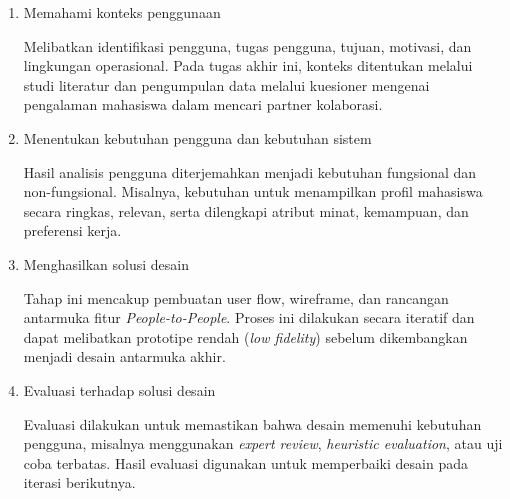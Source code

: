 \begin{enumerate}
\item {Memahami konteks penggunaan}

Melibatkan identifikasi pengguna, tugas pengguna, tujuan, motivasi, dan lingkungan operasional. Pada tugas akhir ini, konteks ditentukan melalui studi literatur dan pengumpulan data melalui kuesioner mengenai pengalaman mahasiswa dalam mencari partner kolaborasi.

\item {Menentukan kebutuhan pengguna dan kebutuhan sistem}

Hasil analisis pengguna diterjemahkan menjadi kebutuhan fungsional dan non-fungsional. Misalnya, kebutuhan untuk menampilkan profil mahasiswa secara ringkas, relevan, serta dilengkapi atribut minat, kemampuan, dan preferensi kerja.

\item {Menghasilkan solusi desain}

Tahap ini mencakup pembuatan user flow, wireframe, dan rancangan antarmuka fitur \textit{People-to-People}. Proses ini dilakukan secara iteratif dan dapat melibatkan prototipe rendah (\textit{low fidelity}) sebelum dikembangkan menjadi desain antarmuka akhir.

\item {Evaluasi terhadap solusi desain}

Evaluasi dilakukan untuk memastikan bahwa desain memenuhi kebutuhan pengguna, misalnya menggunakan \textit{expert review}, \textit{heuristic evaluation}, atau uji coba terbatas. Hasil evaluasi digunakan untuk memperbaiki desain pada iterasi berikutnya.

\end{enumerate}



